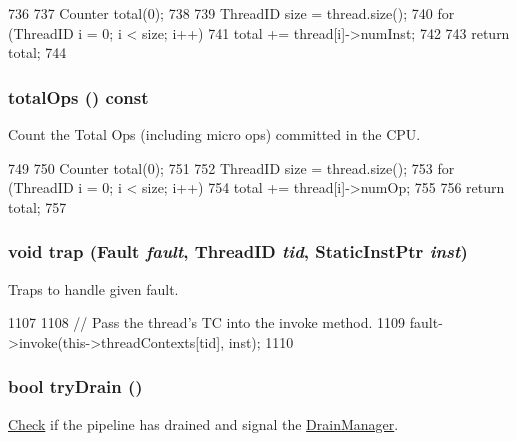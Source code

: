 \begin{DoxyCode}
736 {
737     Counter total(0);
738 
739     ThreadID size = thread.size();
740     for (ThreadID i = 0; i < size; i++)
741         total += thread[i]->numInst;
742 
743     return total;
744 }
\end{DoxyCode}
\hypertarget{classFullO3CPU_a76fa5df6827aaa8fc26deebad97d9e78}{
\subsubsection[{totalOps}]{ totalOps () const}}
\label{classFullO3CPU_a76fa5df6827aaa8fc26deebad97d9e78}
Count the Total Ops (including micro ops) committed in the CPU. 


\begin{DoxyCode}
749 {
750     Counter total(0);
751 
752     ThreadID size = thread.size();
753     for (ThreadID i = 0; i < size; i++)
754         total += thread[i]->numOp;
755 
756     return total;
757 }
\end{DoxyCode}
\hypertarget{classFullO3CPU_a23c9d89f64f4cfd6f48b106b99b119c4}{
\subsubsection[{trap}]{\setlength{\rightskip}{0pt plus 5cm}void trap ({\bf Fault} {\em fault}, \/  {\bf ThreadID} {\em tid}, \/  {\bf StaticInstPtr} {\em inst})}}
\label{classFullO3CPU_a23c9d89f64f4cfd6f48b106b99b119c4}
Traps to handle given fault. 


\begin{DoxyCode}
1107 {
1108     // Pass the thread's TC into the invoke method.
1109     fault->invoke(this->threadContexts[tid], inst);
1110 }
\end{DoxyCode}
\hypertarget{classFullO3CPU_a250ca18dfc0316e340eaa2ec45d73c3e}{
\subsubsection[{tryDrain}]{\setlength{\rightskip}{0pt plus 5cm}bool tryDrain ()}}
\label{classFullO3CPU_a250ca18dfc0316e340eaa2ec45d73c3e}
\hyperlink{classCheck}{Check} if the pipeline has drained and signal the \hyperlink{classDrainManager}{DrainManager}.

